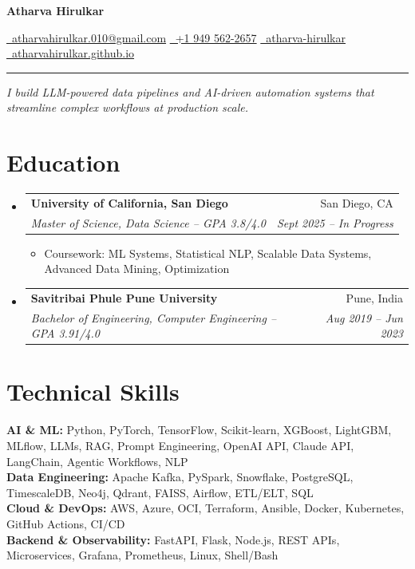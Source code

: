 \documentclass[letterpaper,10.5pt]{article}
\makeatletter
\newcommand{\resumeItem}[1]{
  \item\small{{#1 \vspace{-2pt}}}
}
\newcommand{\resumeSubheading}[4]{
  \vspace{-2pt}\item
    \begin{tabular*}{0.97\textwidth}[t]{l@{\extracolsep{\fill}}r}
      \textbf{#1} & #2 \\
      \textit{\small#3} & \textit{\small #4} \\
    \end{tabular*}\vspace{-6pt}
}
\newcommand{\resumeSubHeadingListStart}{\begin{itemize}[leftmargin=0.15in, label={}]}
\newcommand{\resumeSubHeadingListEnd}{\end{itemize}}
\newcommand{\resumeItemListStart}{\begin{itemize}}
\newcommand{\resumeItemListEnd}{\end{itemize}\vspace{-4pt}}
\makeatother
\begin{document}
\begin{flushleft}
    {\LARGE \textbf{Atharva Hirulkar}}
\end{flushleft}
\vspace{3pt}
\noindent
\href{mailto:atharvahirulkar.010@gmail.com}{\faEnvelope\ atharvahirulkar.010@gmail.com}
\hfill
\href{tel:+19495622657}{\faPhone\ +1 949 562-2657}
\hfill
\href{https://www.linkedin.com/in/atharva-hirulkar/}{\faLinkedin\ atharva-hirulkar}
\hfill
\href{https://atharvahirulkar.github.io/}{\faGlobe\ atharvahirulkar.github.io}

\vspace{5pt}
\vspace{3pt}
\noindent\rule{\textwidth}{1.5pt}
\vspace{2pt}
\noindent\small\textit{I build LLM-powered data pipelines and AI-driven automation systems that streamline complex workflows at production scale.}
\vspace{-6pt}

\section{Education}
  \resumeSubHeadingListStart
    \resumeSubheading
      {University of California, San Diego}{San Diego, CA}
      {Master of Science, Data Science -- GPA 3.8/4.0}{Sept 2025 -- In Progress}
      \resumeItemListStart
        \resumeItem{Coursework: ML Systems, Statistical NLP, Scalable Data Systems, Advanced Data Mining, Optimization}
      \resumeItemListEnd
    \vspace{3pt}
    \resumeSubheading
      {Savitribai Phule Pune University}{Pune, India}
      {Bachelor of Engineering, Computer Engineering -- GPA 3.91/4.0}{Aug 2019 -- Jun 2023}
  \resumeSubHeadingListEnd

\section{Technical Skills}
 \begin{itemize}[leftmargin=0.15in, label={}]
    \small{\item{
     \textbf{AI \& ML:} Python, PyTorch, TensorFlow, Scikit-learn, XGBoost, LightGBM, MLflow, LLMs, RAG, Prompt Engineering, OpenAI API, Claude API, LangChain, Agentic Workflows, NLP \\[2pt]
     \textbf{Data Engineering:} Apache Kafka, PySpark, Snowflake, PostgreSQL, TimescaleDB, Neo4j, Qdrant, FAISS, Airflow, ETL/ELT, SQL \\[2pt]
     \textbf{Cloud \& DevOps:} AWS, Azure, OCI, Terraform, Ansible, Docker, Kubernetes, GitHub Actions, CI/CD \\[2pt]
     \textbf{Backend \& Observability:} FastAPI, Flask, Node.js, REST APIs, Microservices, Grafana, Prometheus, Linux, Shell/Bash
    }}
 \end{itemize}
\end{document}
